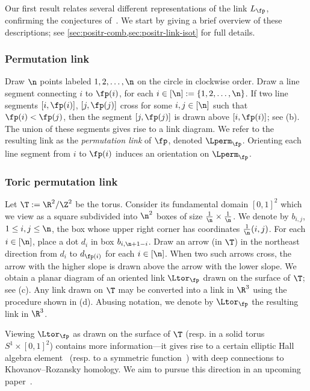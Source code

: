 Our first result relates several different representations of the link $L_\fp$, confirming the conjectures of~\cite{GL_qtcat,GL_cat_combin}. We start by giving a brief overview of these descriptions; see \cref{sec:positr-comb,sec:positr-link-isot} for full details.

\subsubsection{Permutation link} \label{sec:intro:perm_links}
Draw $\n$ points labeled $1,2,\dots,\n$ on the circle in clockwise order. Draw a line segment connecting $i$ to $\fp(i)$, for each $i\in[\n]:=\{1,2,\dots,\n\}$. If two line segments $[i, \fp(i)]$, $[j,\fp(j)]$ cross for some $i,j\in[\n]$ such that $\fp(i)<\fp(j)$, then the segment $[j,\fp(j)]$ is drawn above $[i, \fp(i)]$; see (b). 
%
 The union of these segments gives rise to a link diagram. We refer to the resulting link as the \emph{permutation link} of $\fp$, denoted $\Lperm_\fp$. Orienting each line segment from $i$ to $\fp(i)$ induces an orientation on $\Lperm_\fp$.


\subsubsection{Toric permutation link}\label{sec:intro:tor_links} Let $\T:=\R^2/\Z^2$ be the torus. Consider its fundamental domain $[0,1]^2$ which we view as a square subdivided into $\n^2$ boxes of size $\frac1\n\times \frac1\n$. We denote by $b_{i,j}$, $1\leq i,j\leq \n$, the box whose upper right corner has coordinates $\frac1\n(i,j)$. For each $i\in[\n]$, place a dot $d_i$ in box $b_{i,\n+1-i}$. Draw an arrow (in $\T$) in the northeast direction from $d_i$ to $d_{\fp(i)}$ for each $i\in[\n]$. When two such arrows cross, the arrow with the higher slope is drawn above the arrow with the lower slope. We obtain a planar diagram of an oriented link $\Ltor_\fp$ drawn on the surface of $\T$; see (c). Any link drawn on $\T$ may be converted into a link in $\R^3$ using the procedure shown in (d). Abusing notation, we denote by $\Ltor_\fp$ the resulting link in $\R^3$.

\begin{remark}
Viewing $\Ltor_\fp$ as drawn on the surface of $\T$ (resp. in a solid torus $S^1\times [0,1]^2$) contains more information---it gives rise to a certain elliptic Hall algebra element~\cite{ScVa,BuSc} (resp. to a symmetric 
%
function~\cite{Turaev}) with deep connections to Khovanov--Rozansky homology. We aim to pursue this direction in an upcoming paper~\cite{GL_EHA}.
\end{remark}
%
%


